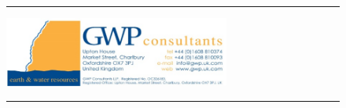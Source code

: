 \documentclass[12pt, letterpaper]{article}
\begin{document}
\begin{figure}[h]
{{\begin{minipage}[c][4.5cm][t]{1\textwidth}
\begin{minipage}[t][2cm][t]{0.5\textwidth}
\begin{itemize}
       				 	\end{itemize}
                            	\end{minipage}
				\vrule
				\begin{minipage}[t][2cm][t]{0.5\textwidth} 
                                		\vspace{2mm}     
                                		\hspace{2mm}
                                    	\raggedright
                                		\text{\small{\textcolor[rgb]{0.1255,0.3058,0.4745}{Client:}} \\ 
                                		\hspace{6mm} \footnotesize{}} 
                                \end{minipage}
                                \hrule
                                \begin{minipage}[c][2.5cm][c]{0.5\textwidth} 
        					\centering
                				\includegraphics[height=2.3cm]{../logo/gwp.png}
            			\end{minipage}
				\vrule
				\begin{minipage}[c][2.5cm][c]{0.495\textwidth} 
        				\begin{minipage}[c][1.3cm][c]{1\textwidth} 
            				\vspace{2mm}
            				\hspace*{2mm}
            				\raggedright
            				\text{\small{\textcolor[rgb]{0.1255,0.3058,0.4745}{Project: }} \\ 
                				\hspace{6mm} \footnotesize{}}
        				\end{minipage}
        				\hrule
        				\begin{minipage}[c][1.2cm][t]{1\textwidth} 
            				\begin{minipage}[c][1.2cm][t]{0.7\textwidth}    
        						\vspace{1mm}
       						\hspace{2mm}
            					\raggedright
        						\text{\small{\textcolor[rgb]{0.1255,0.3058,0.4745}{Drawing No}} \\ 
        						\hspace{6mm} \footnotesize{}} 

\end{minipage}
\end{minipage}
\end{minipage}
\end{minipage}}}
\end{figure}
\end{document}
